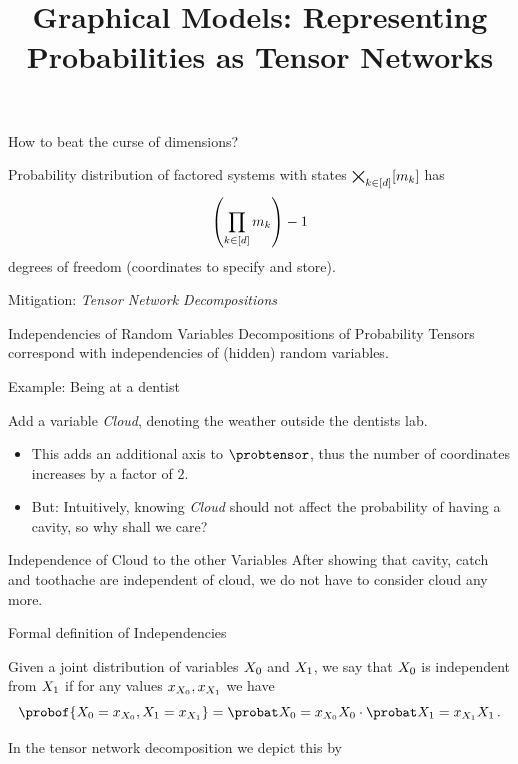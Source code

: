 \documentclass{beamer}
\title[Graphical Models]{
	\coursechaptertwo \\
	{\huge Graphical Models: Representing Probabilities as Tensor Networks}
}
\begin{document}
{\frame[plain]{\titlepage}}



\begin{frame}{How to beat the curse of dimensions?}

Probability distribution of factored systems with states $\bigtimes_{k\in[d]}[m_{k}]$ has 
	\[\left(\prod_{k\in[d]}m_{k}\right) -1 \]
degrees of freedom (coordinates to specify and store).

\medskip

Mitigation: \emph{Tensor Network Decompositions}

\begin{block}{Independencies of Random Variables}
	Decompositions of Probability Tensors correspond with independencies of (hidden) random variables.
\end{block}

\end{frame}



\begin{frame}{Example: Being at a dentist}

Add a variable \emph{Cloud}, denoting the weather outside the dentists lab.
\begin{itemize}
	\item This adds an additional axis to $\probtensor$, thus the number of coordinates increases by a factor of $2$.
	\item But: Intuitively, knowing \emph{Cloud} should not affect the probability of having a cavity, so why shall we care?
\end{itemize}

\begin{block}{Independence of Cloud to the other Variables}
	After showing that cavity, catch and toothache are independent of cloud, we do not have to consider cloud any more.
\end{block}

\end{frame}



\begin{frame}{Formal definition of Independencies}

\begin{definition}[Independence]
	Given a joint distribution of variables $X_{0}$ and $X_{1}$, we say that $X_{0}$ is independent from $X_{1}$ if for any values $x_{X_{0}},x_{X_{1}}$ we have
		\[ \probof{\exrandom=\catindexof{\exrandom},\secexrandom=\catindexof{\secexrandom}} 
		= \margprobof{\exrandom=\catindexof{\exrandom}}{\exrandom}
		 \cdot 
		 \margprobof{\secexrandom=\catindexof{\secexrandom}}{\secexrandom} \, . \]
\end{definition}
In the tensor network decomposition we depict this by
	\begin{center}
		
	\end{center}
\end{frame}
\end{document}
